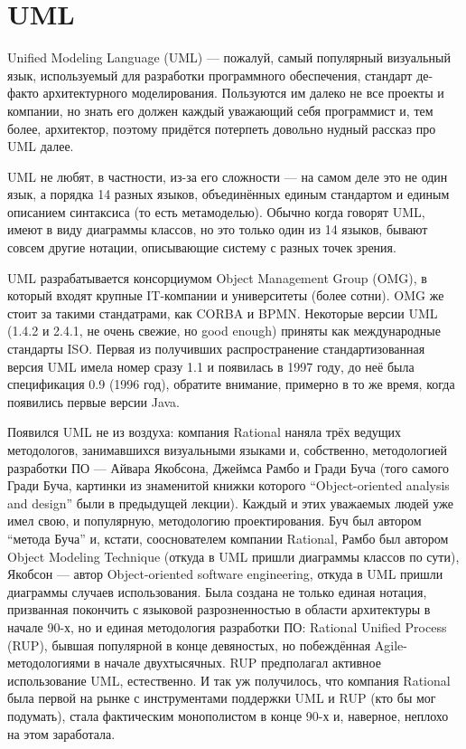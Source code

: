 \documentclass[a5paper]{article}
\begin{document}
\section{UML}

Unified Modeling Language (UML) --- пожалуй, самый популярный визуальный язык, используемый для разработки программного обеспечения, стандарт де-факто архитектурного моделирования. Пользуются им далеко не все проекты и компании, но знать его должен каждый уважающий себя программист и, тем более, архитектор, поэтому придётся потерпеть довольно нудный рассказ про UML далее. 

UML не любят, в частности, из-за его сложности --- на самом деле это не один язык, а порядка 14 разных языков, объединённых единым стандартом и единым описанием синтаксиса (то есть метамоделью). Обычно когда говорят UML, имеют в виду диаграммы классов, но это только один из 14 языков, бывают совсем другие нотации, описывающие систему с разных точек зрения.

UML разрабатывается консорциумом Object Management Group (OMG), в который входят крупные IT-компании и университеты (более сотни). OMG же стоит за такими стандатрами, как CORBA и BPMN. Некоторые версии UML (1.4.2 и 2.4.1, не очень свежие, но good enough) приняты как международные стандарты ISO. Первая из получивших распространение стандартизованная версия UML имела номер сразу 1.1 и появилась в 1997 году, до неё была спецификация 0.9 (1996 год), обратите внимание, примерно в то же время, когда появились первые версии Java. 

Появился UML не из воздуха: компания Rational наняла трёх ведущих методологов, занимавшихся визуальными языками и, собственно, методологией разработки ПО --- Айвара Якобсона, Джеймса Рамбо и Гради Буча (того самого Гради Буча, картинки из знаменитой книжки которого ``Object-oriented analysis and design'' были в предыдущей лекции). Каждый и этих уважаемых людей уже имел свою, и популярную, методологию проектирования. Буч был автором ``метода Буча'' и, кстати, сооснователем компании Rational, Рамбо был автором Object Modeling Technique (откуда в UML пришли диаграммы классов по сути), Якобсон --- автор Object-oriented software engineering, откуда в UML пришли диаграммы случаев использования. Была создана не только единая нотация, призванная покончить с языковой разрозненностью в области архитектуры в начале 90-х, но и единая методология разработки ПО: Rational Unified Process (RUP), бывшая популярной в конце девяностых, но побеждённая Agile-методологиями в начале двухтысячных. RUP предполагал активное использование UML, естественно. И так уж получилось, что компания Rational была первой на рынке с инструментами поддержки UML и RUP (кто бы мог подумать), стала фактическим монополистом в конце 90-х и, наверное, неплохо на этом заработала.
\end{document}
